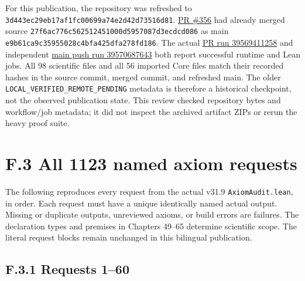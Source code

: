 \documentclass[
  11pt,
  oneside]{book}
\begin{document}
For this publication, the repository was refreshed to
\texttt{3d443ec29eb1\allowbreak 7af1fc00699a\allowbreak 74e2d42d7351\allowbreak 6d81}.
\href{https://github.com/MurphyHoops/UEOT/pull/356}{PR \#356} had
already merged source \texttt{27f6ac776c56\allowbreak 2512451000d5\allowbreak 957087d3ecdc\allowbreak d086}
as main \texttt{e9b61ca9c359\allowbreak 55028c4bfa42\allowbreak 5dfa278fd186}. The actual
\href{https://github.com/MurphyHoops/UEOT/actions/runs/39569411258}{PR
run 39569411258} and independent
\href{https://github.com/MurphyHoops/UEOT/actions/runs/39570687643}{main
push run 39570687643} both report successful runtime and Lean jobs. All
98 scientific files and all 56 imported Core files match their recorded
hashes in the source commit, merged commit, and refreshed main. The
older \texttt{LOCAL\_\allowbreak VERIFIED\_\allowbreak REMOTE\_\allowbreak PENDING} metadata is therefore a
historical checkpoint, not the observed publication state. This review
checked repository bytes and workflow/job metadata; it did not inspect
the archived artifact ZIPs or rerun the heavy proof suite.

\section{F.3 All 1123 named axiom requests}

The following reproduces every request from the actual v31.9
\texttt{Axiom\allowbreak Audit.\allowbreak lean}, in order. Each request must have a unique
identically named actual output. Missing or duplicate outputs,
unreviewed axioms, or build errors are failures. The declaration types
and premises in Chapters 49--65 determine scientific scope. The literal
request blocks remain unchanged in this bilingual publication.

\subsection{F.3.1 Requests 1--60}
\end{document}
